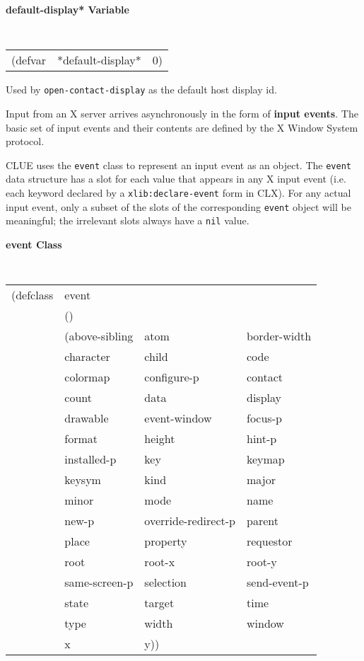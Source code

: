 {\samepage
{\large {\bf *default-display* \hfill Variable}} 
\begin{flushright} \parbox[t]{6.125in}{
\tt
\begin{tabular}{lll}
\raggedright
(defvar & *default-display* & 0)
\end{tabular}
\rm

}\end{flushright}}

\begin{flushright} \parbox[t]{6.125in}{
Used by {\tt open-contact-display} as the default host display id.
}\end{flushright}


Input from an X server arrives
asynchronously in the form of {\bf input events}.  
The basic set of input events and their contents are defined by the X Window
System protocol.

CLUE uses the {\tt event} class to represent an input event as an
object. The {\tt event} data structure has a slot for each value that appears in
any X input event (i.e.  each
keyword declared by a {\tt xlib:declare-event} form in CLX). 
For any actual input event, only a subset of the slots of the
corresponding {\tt event} object will be meaningful; the irrelevant slots
always have a {\tt nil} value.

\pagebreak
{\samepage
{\large {\bf event \hfill Class}} 
\begin{flushright} \parbox[t]{6.125in}{
\tt
\begin{tabular}{llll}
\raggedright
(defclass & event & \\ 
&()\\
&(above-sibling & atom & border-width\\
&character & child & code\\
&colormap & configure-p & contact\\
&count & data & display\\
&drawable & event-window & focus-p\\
&format & height & hint-p\\
&installed-p & key & keymap \\
& keysym &kind & major \\
& minor &mode & name \\
& new-p &override-redirect-p & parent \\
& place &property & requestor \\
& root &root-x & root-y \\
& same-screen-p &selection & send-event-p \\
& state &target & time \\
&type  & width & window \\
& x  & y)) 									     
\end{tabular}
\rm

}\end{flushright}}

